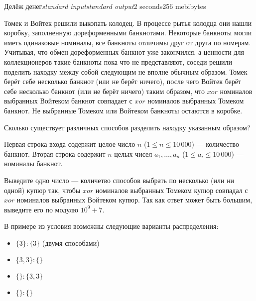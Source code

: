 \begin{problem}{Делёж денег}{\textsl{standard input}}{\textsl{standard output}}{2 seconds}{256 mebibytes}{}

Томек и Войтек решили выкопать колодец. В процессе рытья колодца они нашли коробку, заполненную дореформенными банкнотами.
Некоторые банкноты могли иметь одинаковые номиналы, все банкноты отличимы друг от друга по номерам. Учитывая, что обмен
дореформенных банкнот уже закончился, а ценности для коллекционеров такие банкноты пока что не представляют, соседи решили
поделить находку между собой следующим не вполне обычным образом. Томек берёт себе несколько банкнот (или не берёт ничего), после чего Войтек
берёт себе несколько банкнот (или не берёт ничего) таким образом, что $xor$ номиналов выбранных Войтеком банкнот совпадает с $xor$ номиналов
выбранных Томеком банкнот. Не выбранные Томеком или Войтеком банкноты остаются в коробке.

Сколько существует различных способов разделить находку указанным образом?

\InputFile

Первая строка входа содержит целое число $n$ ($1 \leq n \leq 10\,000$) --- количество банкнот. Вторая строка содержит
$n$ целых чисел $a_1, \ldots, a_n$ ($1 \leq a_i \leq 10\,000$) --- номиналы банкнот.

\OutputFile

Выведите одно число --- количетво способов выбрать по несколько (или ни одной) купюр так, чтобы $xor$ номиналов выбранных Томеком
купюр совпадал с $xor$ номиналов выбранных Войтеком купюр. Так как ответ может быть большим, выведите его по модулю
$10^9+7$.

\Examples
\begin{example}
%
\end{example}

\Note

В примере из условия возможны следующие варианты распределения:
\begin{itemize}
    \item $\{3\} : \{3\}$ (двумя способами)
    \item $\{3,3\} : \{\}$ 
    \item $\{\} : \{3,3\}$ 
    \item $\{\} : \{\}$ 
\end{itemize}

\end{problem}
